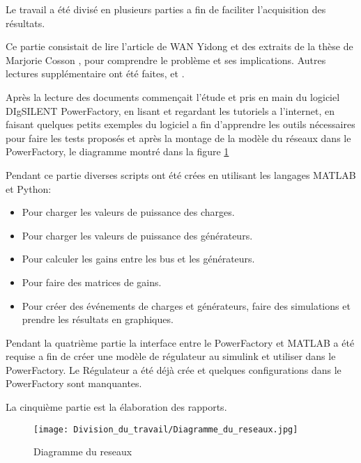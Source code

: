 
Le travail a été divisé en plusieurs parties a fin de faciliter l'acquisition des résultats.

Ce partie consistait de lire l'article de WAN Yidong \cite{yidong} et des extraits de la thèse de Marjorie  Cosson \cite{cosson:tel-01374469}, pour comprendre le problème et ses implications. Autres lectures supplémentaire ont été faites, \cite{farina2015model} et \cite{mariani2013controllo}.

Après la lecture des documents commençait l'étude et pris en main du logiciel DIgSILENT PowerFactory, en lisant et regardant les tutoriels a l'internet, en faisant quelques petits exemples du logiciel a fin d'apprendre les outils nécessaires pour faire les tests proposés et après la montage de la modèle du réseaux dans le PowerFactory, le diagramme montré dans la figure \ref{fig:Diagramme_du_reseaux} 

Pendant ce partie diverses scripts ont été crées en utilisant les langages MATLAB et Python:
\begin{itemize}
\item Pour charger les valeurs de puissance des charges.
\item Pour charger les valeurs de puissance des générateurs.
\item Pour calculer les gains entre les bus et les générateurs.
\item Pour faire des matrices de gains.
\item Pour créer des événements de charges et générateurs, faire des simulations et prendre les résultats en graphiques.
\end{itemize}

Pendant la quatrième partie la interface entre le PowerFactory et MATLAB a été requise a fin de créer une modèle de régulateur au simulink et utiliser dans le PowerFactory. Le Régulateur a été déjà crée et quelques configurations dans le PowerFactory sont manquantes.


La cinquième partie est la élaboration des rapports.



\begin{figure}[H]
	\begin{center}	
		\texttt{[image: Division\_du\_travail/Diagramme\_du\_reseaux.jpg]}
		\caption{Diagramme du reseaux}
		\label{fig:Diagramme_du_reseaux}
	\end{center}
\end{figure}
\pagebreak